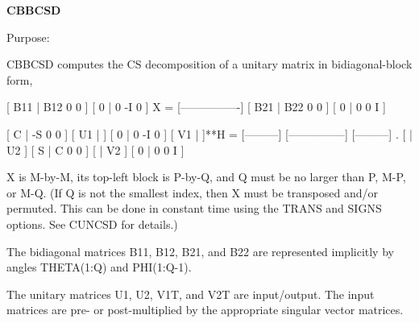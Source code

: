 {\bfseries C\+B\+B\+C\+S\+D} 

 \begin{DoxyParagraph}{Purpose\+: }
\begin{DoxyVerb} CBBCSD computes the CS decomposition of a unitary matrix in
 bidiagonal-block form,


     [ B11 | B12 0  0 ]
     [  0  |  0 -I  0 ]
 X = [----------------]
     [ B21 | B22 0  0 ]
     [  0  |  0  0  I ]

                               [  C | -S  0  0 ]
                   [ U1 |    ] [  0 |  0 -I  0 ] [ V1 |    ]**H
                 = [---------] [---------------] [---------]   .
                   [    | U2 ] [  S |  C  0  0 ] [    | V2 ]
                               [  0 |  0  0  I ]

 X is M-by-M, its top-left block is P-by-Q, and Q must be no larger
 than P, M-P, or M-Q. (If Q is not the smallest index, then X must be
 transposed and/or permuted. This can be done in constant time using
 the TRANS and SIGNS options. See CUNCSD for details.)

 The bidiagonal matrices B11, B12, B21, and B22 are represented
 implicitly by angles THETA(1:Q) and PHI(1:Q-1).

 The unitary matrices U1, U2, V1T, and V2T are input/output.
 The input matrices are pre- or post-multiplied by the appropriate
 singular vector matrices.\end{DoxyVerb}
 
\end{DoxyParagraph}

